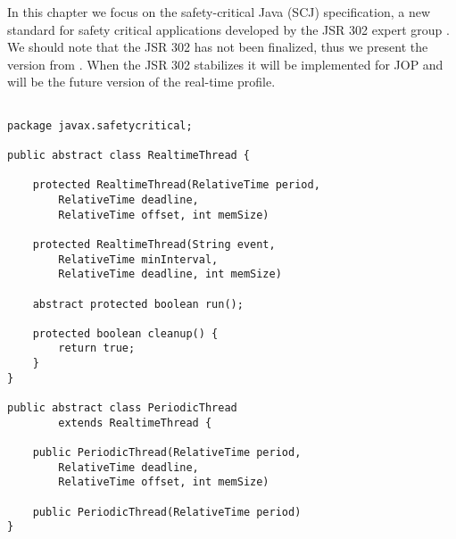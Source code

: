 In this chapter we focus on the safety-critical Java (SCJ)
specification, a new standard for safety critical applications
developed by the JSR 302 expert group \cite{scj:as:proceedings}. We
should note that the JSR 302 has not been finalized, thus we present
the version from \cite{jop:scjmodes}. When the JSR 302 stabilizes it
will be implemented for JOP and will be the future version of the
real-time profile.


\begin{lstlisting}[float=t!,caption={Periodic thread definition for SCJ},
label=lst:scjdef]

package javax.safetycritical;

public abstract class RealtimeThread {

    protected RealtimeThread(RelativeTime period,
        RelativeTime deadline,
        RelativeTime offset, int memSize)

    protected RealtimeThread(String event,
        RelativeTime minInterval,
        RelativeTime deadline, int memSize)

    abstract protected boolean run();

    protected boolean cleanup() {
        return true;
    }
}

public abstract class PeriodicThread
        extends RealtimeThread {

    public PeriodicThread(RelativeTime period,
        RelativeTime deadline,
        RelativeTime offset, int memSize)

    public PeriodicThread(RelativeTime period)
}
\end{lstlisting}

